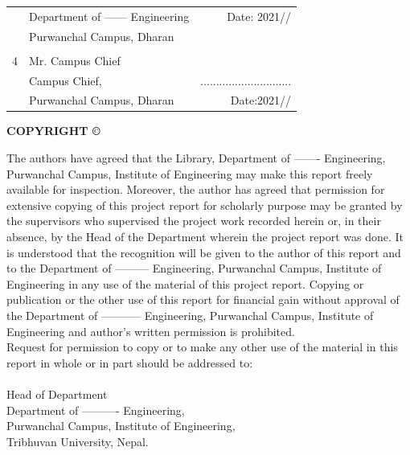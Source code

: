 \documentclass[a4paper, 12pt ]{report}
\begin{document}
{\begin{flushright}
\begin{tabular}{llr}
		& Department of ------ Engineering & Date: 2021/\hspace{15pt}/\hspace{15pt}  \\
		& Purwanchal Campus, Dharan        &                         \\
		&                                  &                         \\
		4 & Mr. Campus Chief                         &                         \\
		& Campus Chief,                    & \hspace{30pt} ............................. \\
		& Purwanchal Campus, Dharan        & Date:2021/\hspace{15pt}/\hspace{15pt}      
	\end{tabular}
	\end{flushright}	
	}

	
	
	
	\newpage
	\cleardoublepage
	\setcounter{page}{4}
	\begin{center}\fontsize{18}{0} \textbf{COPYRIGHT \copyright}\end{center}
	{The authors have agreed that the Library, Department of ------- Engineering, Purwanchal Campus, Institute of Engineering may make this report freely available for inspection. Moreover, the author has agreed that permission for extensive copying of this project report for scholarly purpose may be granted by the supervisors who supervised the project work recorded herein or, in their absence, by the Head of the Department wherein the project report was done. It is understood that the recognition will be given to the author of this report and to the Department of --------- Engineering, Purwanchal Campus, Institute of Engineering in any use of the material of this project report. Copying or publication or the other use of this report for financial gain without approval of the Department of ----------- Engineering, Purwanchal Campus, Institute of Engineering and author’s written permission is prohibited.
	\\
	Request for permission to copy or to make any other use of the material in this report in whole or in part should be addressed to: 
	\\
	\\
	Head of Department \\
	Department of ---------- Engineering, \\
	Purwanchal Campus, Institute of Engineering,\\
	Tribhuvan University, Nepal.
	}
	
\end{document}
